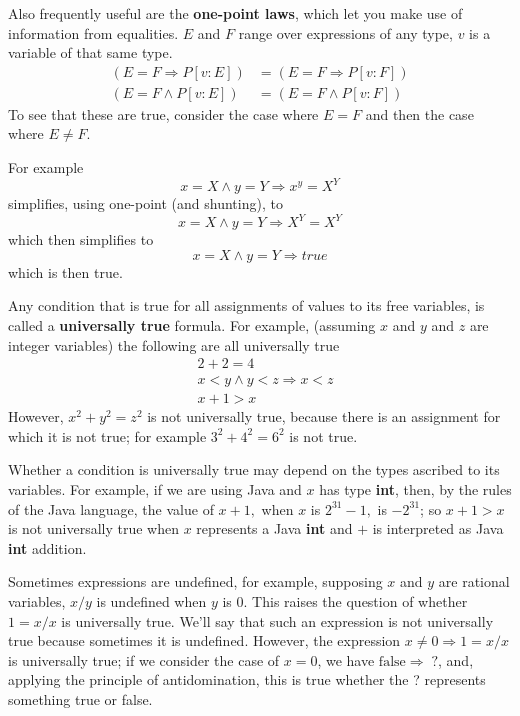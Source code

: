 \documentclass[11pt]{article}%
\begin{document}
Also frequently useful are the \textbf{one-point laws}, which let you make use
of information from equalities. $E$ and $F$ range over expressions of any
type, $v$ is a variable of that same type.
\begin{align*}
\left(  E=F\Rightarrow P[v:E]\right)   &  =\left(  E=F\Rightarrow
P[v:F]\right) \\
\left(  E=F\wedge P[v:E]\right)   &  =\left(  E=F\wedge P[v:F]\right)
\end{align*}
To see that these are true, consider the case where $E=F$ and then the case
where $E\neq F$.

For example%
\[
x=X\wedge y=Y\Rightarrow x^{y}=X^{Y}%
\]
simplifies, using one-point (and shunting), to%
\[
x=X\wedge y=Y\Rightarrow X^{Y}=X^{Y}%
\]
which then simplifies to%
\[
x=X\wedge y=Y\Rightarrow\mathit{true}%
\]
which is then true.

Any condition that is true for all assignments of values to its free
variables, is called a \textbf{universally true} formula. For example,
(assuming $x$ and $y$ and $z$ are integer variables) the following are all
universally true%
\begin{align*}
&  \left.  2+2=4\right. \\
&  \left.  x<y\wedge y<z\Rightarrow x<z\right. \\
&  \left.  x+1>x\right.
\end{align*}
However, $x^{2}+y^{2}=z^{2}$ is not universally true, because there is an
assignment for which it is not true; for example $3^{2}+4^{2}=6^{2}$ is not true.

Whether a condition is universally true may depend on the types ascribed to
its variables. For example, if we are using Java and $x$ has type
\textbf{int}, then, by the rules of the Java language, the value of $x+1,$
when $x$ is $2^{31}-1,$ is $-2^{31}$; so $x+1>x$ is not universally true when
$x$ represents a Java \textbf{int} and $+$ is interpreted as Java \textbf{int} addition.

Sometimes expressions are undefined, for example, supposing $x$ and $y$ are
rational variables, $x/y$ is undefined when $y$ is $0$. This raises the
question of whether $1=x/x$ is universally true. We'll say that such an
expression is not universally true because sometimes it is undefined.
However, the expression $x\neq 0\Rightarrow1=x/x$ is universally true;
if we consider the case of $x=0$, we
have $\mathrm{false}\Rightarrow\;?$, and, applying the principle of
antidomination, this is $\mathrm{true}$ whether the ? represents something true or false.
\end{document}
